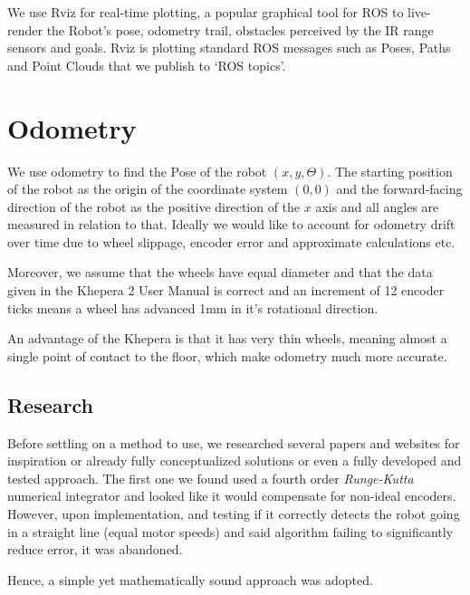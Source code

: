 \documentclass[11pt, a4paper]{article}
\begin{document}
We use Rviz for real-time plotting, a popular graphical tool for ROS to live-render the 
Robot's pose, odometry trail, obstacles perceived by the IR range sensors and goals. 
Rviz is plotting standard ROS messages such as Poses, Paths and Point Clouds that we publish 
to `ROS topics'.



\newpage
\section{Odometry}
\label{Odometry}


We use odometry to find the Pose of the robot ${(x,y,\Theta)}$. The starting position of the robot as the origin of the coordinate system ${(0, 0)}$
and the forward-facing direction of the robot as the positive direction of the $x$ axis and
all angles are measured in relation to that. Ideally we would like to account for odometry drift
over time due to wheel slippage, encoder error and approximate calculations etc.

Moreover, we assume that the wheels have equal diameter and that the data given in the 
Khepera 2 User Manual \cite{khepera_manual} is correct and an increment of 12 encoder ticks 
means a wheel has advanced 1mm in it's rotational direction.

An advantage of the Khepera is that it has very thin wheels, meaning almost a single point of contact
to the floor, which make odometry much more accurate.

\subsection{Research}

Before settling on a method to use, we researched several papers and websites for inspiration or 
already fully conceptualized solutions or even a fully developed and tested approach. The first one
we found used a fourth order \textit{Runge-Kutta} numerical integrator \cite{runge_kutta} and looked like 
it would compensate for non-ideal encoders. However, upon implementation, and  testing if it correctly 
detects the robot going in a straight line (equal motor speeds) and said algorithm failing to significantly reduce error, it was abandoned. 

Hence, a simple yet mathematically sound approach \cite{odo_used} was adopted. 
\end{document}
